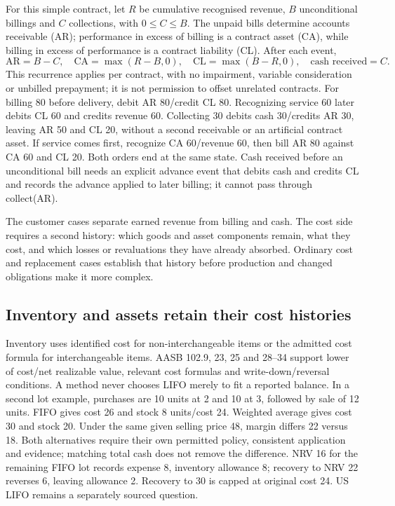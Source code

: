 For this simple contract, let $R$ be cumulative recognised revenue, $B$
unconditional billings and $C$ collections, with $0\leq C\leq B$. The unpaid
bills determine accounts receivable (AR); performance in excess of billing is
a contract asset (CA), while billing in excess of performance is a contract
liability (CL). After each event,
\[
 \mathrm{AR}=B-C,\quad \mathrm{CA}=\max(R-B,0),\quad
 \mathrm{CL}=\max(B-R,0),\quad \text{cash received}=C.
\]
This recurrence applies per contract, with no impairment, variable consideration or unbilled prepayment; it is not permission to offset unrelated contracts. For billing 80 before delivery, debit AR 80/credit CL 80. Recognizing service 60 later debits CL 60 and credits revenue 60. Collecting 30 debits cash 30/credits AR 30, leaving AR 50 and CL 20, without a second receivable or an artificial contract asset. If service comes first, recognize CA 60/revenue 60, then bill AR 80 against CA 60 and CL 20. Both orders end at the same state. Cash received before an unconditional bill needs an explicit advance event that debits cash and credits CL and records the advance applied to later billing; it cannot pass through collect(AR).




The customer cases separate earned revenue from billing and cash.
The cost side requires a second history: which goods and asset components
remain, what they cost, and which losses or revaluations they have already
absorbed. Ordinary cost and replacement cases establish that history
before production and changed obligations make it more complex.

\subsection{Inventory and assets retain their cost histories}
\label{sec:corporate-cost-histories}

Inventory uses identified cost for non-interchangeable items or the admitted cost formula for interchangeable items. AASB 102.9, 23, 25 and 28--34 support lower of cost/net realizable value, relevant cost formulas and write-down/reversal conditions. A method never chooses LIFO merely to fit a reported balance. In a second lot example, purchases are 10 units at 2 and 10 at 3, followed by sale of 12 units. FIFO gives cost 26 and stock 8 units/cost 24. Weighted average gives cost 30 and stock 20. Under the same given selling price 48, margin differs 22 versus 18. Both alternatives require their own permitted policy, consistent application and evidence; matching total cash does not remove the difference. NRV 16 for the remaining FIFO lot records expense 8, inventory allowance 8; recovery to NRV 22 reverses 6, leaving allowance 2. Recovery to 30 is capped at original cost 24. US LIFO remains a separately sourced question.

